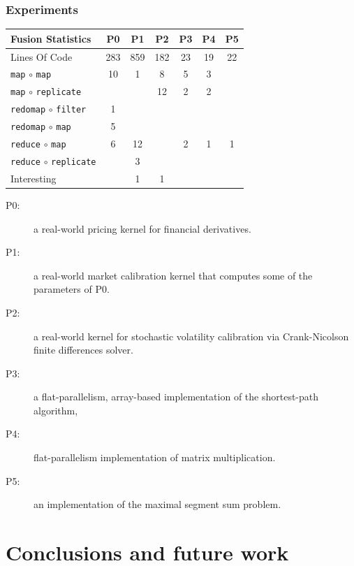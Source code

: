 \documentclass{beamer}
\begin{document}
\begin{frame}[fragile,t]
  \frametitle{Experiments}

{\tiny
\begin{center}
\begin{tabular}{l|c|c|c|c|c|c}
Fusion Statistics & P0 & P1 & P2 & P3 & P4 & P5 \\\hline
Lines Of Code          & 283 & 859 & 182 & 23 & 19 & 22\\\hline\hline
{\tt map} $\circ$ {\tt map}          & 10 & 1  & 8  & 5 & 3  &   \\\hline
{\tt map} $\circ$ {\tt replicate}    &    &    & 12 & 2 & 2  &   \\\hline
{\tt redomap} $\circ$ {\tt filter}   & 1  &    &    &   &    &   \\\hline
{\tt redomap} $\circ$ {\tt map}      & 5  &    &    &   &    &   \\\hline
{\tt reduce} $\circ$ {\tt map}       & 6  & 12 &    & 2 & 1  & 1 \\\hline
{\tt reduce} $\circ$ {\tt replicate} &    & 3  &    &   &    &   \\\hline\hline
Interesting            &    & 1  & 1  &   &    &   \\\hline
\end{tabular}
\end{center}
}

\begin{description}
\item[P0:] a real-world pricing kernel for financial derivatives.
\item[P1:] a real-world market calibration kernel that computes some
  of the parameters of P0.
\item[P2:] a real-world kernel for stochastic volatility calibration
  via Crank-Nicolson finite differences solver.
\item[P3:] a flat-parallelism, array-based implementation of the
  shortest-path algorithm,
\item[P4:] flat-parallelism implementation of matrix multiplication.
\item[P5:] an implementation of the maximal segment sum problem.
\end{description}

\end{frame}

\section{Conclusions and future work}
\end{document}
